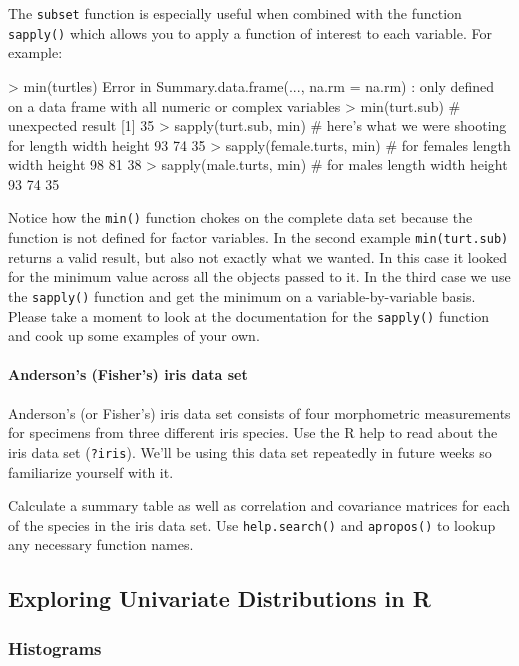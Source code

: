 The \lstinline!subset! function is especially useful when combined with
the function \lstinline!sapply()! which allows you to apply a function
of interest to each variable. For example:
%
\begin{R}
> min(turtles)
Error in Summary.data.frame(..., na.rm = na.rm) : 
        only defined on a data frame with all numeric or complex variables
> min(turt.sub)  # unexpected result
[1] 35
> sapply(turt.sub, min) # here's what we were shooting for
length  width height 
    93     74     35
> sapply(female.turts, min) # for females
length  width height 
    98     81     38 
> sapply(male.turts, min) # for males
length  width height 
    93     74     35      
\end{R}
%
Notice how the \lstinline!min()! function chokes on the complete data
set because the function is not defined for factor variables. In the
second example \lstinline!min(turt.sub)! returns a valid result, but
also not exactly what we wanted. In this case it looked for the minimum
value across all the objects passed to it. In the third case we use the
\lstinline!sapply()! function and get the minimum on a
variable-by-variable basis. Please take a moment to look at the
documentation for the \lstinline!sapply()! function and cook up some
examples of your own.

\paragraph{Anderson's (Fisher's) iris data set}

Anderson's (or Fisher's) iris data set consists of four morphometric
measurements for specimens from three different iris species. Use the R
help to read about the iris data set (\lstinline!?iris!). We'll be using
this data set repeatedly in future weeks so familiarize yourself with
it.

\begin{assignment}
Calculate a summary table as well as correlation
and covariance matrices for each of the species in the iris data set.
Use \lstinline!help.search()! and \lstinline!apropos()! to lookup any
necessary function names.
\end{assignment}


\subsection{Exploring Univariate Distributions in R}

\subsubsection{Histograms}

